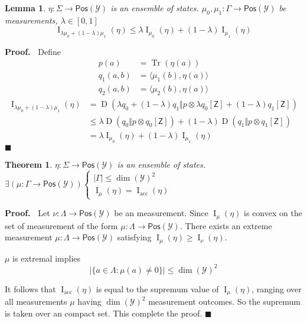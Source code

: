 \documentclass[aps,pra,onecolumn,notitlepage,superscriptaddress]{revtex4-1}
\newcommand{\reg}[1]{\mathsf{#1}}
\newcommand{\spc}[1]{\mathcal{#1}}
\newcommand{\Pos}{\mathsf{Pos}}
\def\>{\rangle}
\def\<{\langle}
\newcommand{\Tr}{\operatorname{Tr}}
\newcommand{\op}[1]{\operatorname{#1}}
\newtheorem{theo}{Theorem}
\newtheorem{lemma}{Lemma}
\def\Proof{{\bf Proof.~}}
\def\qed{$\blacksquare$ \newline}
\begin{document}
    \begin{lemma}
        $\eta : \Sigma \to \Pos(\spc Y)$ is an ensemble of states. $\mu_0, \mu_1 : \Gamma \to \Pos(\spc Y)$ be measurements, $\lambda \in [0,1]$
        \begin{equation}
            \op I_{\lambda \mu_0 + (1-\lambda) \mu_1} (\eta) \leq \lambda \op I_{\mu_0} (\eta) + (1-\lambda) \op I_{\mu_1} (\eta)
        \end{equation}
    \end{lemma}
    \Proof
    Define
    \begin{align*}
        p(a) &= \Tr(\eta(a)) \\
        q_1(a, b) &= \< \mu_1(b), \eta(a) \> \\
        q_2(a, b) &= \< \mu_2(b), \eta(a) \>
    \end{align*}
    \begin{align*}
        \op I_{\lambda \mu_0 + (1-\lambda) \mu_1} (\eta)
        &= \op D(\lambda q_0 + (1-\lambda) q_1 \Vert p \otimes \lambda q_0 [\reg Z] + (1-\lambda) q_1 [\reg Z]) \\
        &\leq \lambda\op D( q_0  \Vert p \otimes q_0 [\reg Z]) + (1-\lambda) \op D(q_1 \Vert p \otimes q_1 [\reg Z])\\
        &= \lambda \op I_{\mu_0} (\eta) + (1-\lambda) \op I_{\mu_1}(\eta)
    \end{align*}
    \qed

    \begin{theo}
        $\eta : \Sigma \to \Pos(\spc Y)$ is an ensemble of states. $\exists (\mu : \Gamma \to \Pos(\spc Y)) \begin{cases}
            |\Gamma| \leq \dim(\spc Y)^2 \\
            \op I_{\mu} (\eta) = \op I_{\text{acc}}(\eta)
        \end{cases}$
    \end{theo}
    \Proof
    Let $\nu: \Lambda \to \Pos(\spc Y)$ be an measurement. Since $\op I_{\mu}(\eta)$ is convex on the set of measurement of the form $\mu: \Lambda \to \Pos(\spc Y)$. There exists an extreme measurement $\mu: \Lambda \to \Pos(\spc Y)$ satisfying $\op I_{\mu}(\eta) \geq \op I_{\nu}(\eta)$.

    $\mu$ is extremal implies
    \begin{equation}
        |\{ a \in \Lambda : \mu(a) \neq 0 \}| \leq \dim(\spc Y)^2
    \end{equation}

    It follows that $\op I_{\text{acc}}(\eta)$ is equal to the supremum value of $\op I_{\mu}(\eta)$, ranging over all measurements $\mu$ having $\dim(\spc Y)^2$ measurement outcomes. So the supremum is taken over an compact set. This complete the proof. \qed
\end{document}
